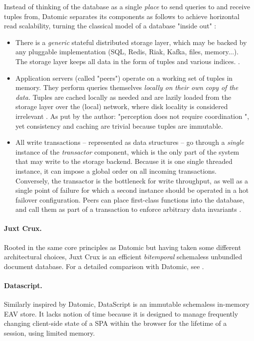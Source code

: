 Instead of thinking of the database as a single \emph{place} to send queries to and receive tuples from, Datomic separates its components as follows to achieve horizontal read scalability, turning the classical model of a database "inside out" \cite{kleppmann2017designing}:
\begin{itemize}
  \item There is a \emph{generic} stateful distributed storage layer, which may be backed by any pluggable implementation (SQL, Redis, Riak, Kafka, files, memory...). The storage layer keeps all data in the form of tuples and various indices. \cite{hickey2019datomic}.
  \item Application servers (called "peers") operate on a working set of tuples in memory. They perform queries themselves \emph{locally on their own copy of the data.} Tuples are cached locally as needed and are lazily loaded from the storage layer over the (local) network, where disk locality is considered irrelevant \cite{ananthanarayanan2011disk}. As put by the author: "perception does not require coordination \cite{hickey2012values}", yet consistency and caching are trivial because tuples are immutable.
  \item All write transactions -- represented as data structures -- go through a \emph{single} instance of the \emph{transactor} component, which is the only part of the system that may write to the storage backend. Because it is one single threaded instance, it can impose a global order on all incoming transactions. Conversely, the transactor is the bottleneck for write throughput, as well as a single point of failure for which a second instance should be operated in a hot failover configuration. Peers can place first-class functions into the database, and call them as part of a transaction to enforce arbitrary data invariants \cite{datomicdocs}.
\end{itemize}


\paragraph{Juxt Crux.} Rooted in the same core principles as Datomic but having taken some different architectural choices, Juxt Crux is an efficient \emph{bitemporal} schemaless unbundled document database. For a detailed comparison with Datomic, see \cite{juxtcrux}.

\paragraph{Datascript.} Similarly inspired by Datomic, DataScript \cite{prokopov15datascript} is an immutable schemaless in-memory EAV store. It lacks notion of time because it is designed to manage frequently changing client-side state of a \gls{SPA} within the browser for the lifetime of a session, using limited memory.


